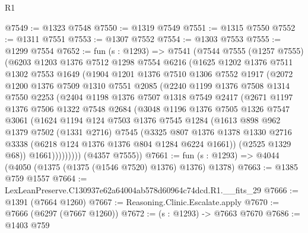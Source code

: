 \begin{lexlean}{R1}
\begin{coremodule}
@7549 := @1323 @7548
@7550 := @1319 @7549
@7551 := @1315 @7550
@7552 := @1311 @7551
@7553 := @1307 @7552
@7554 := @1303 @7553
@7555 := @1299 @7554
@7652 := fun (s : @1293) =>
  @7541
    (@7544
      @7555
      (@1257 @7555)
      (@6203
        @1203
        @1376
        @7512
        @1298
        @7554
        @6216
        (@1625
          @1202
          @1376
          @7511
          @1302
          @7553
          @1649
          (@1904
            @1201
            @1376
            @7510
            @1306
            @7552
            @1917
            (@2072
              @1200
              @1376
              @7509
              @1310
              @7551
              @2085
              (@2240
                @1199
                @1376
                @7508
                @1314
                @7550
                @2253
                (@2404
                  @1198
                  @1376
                  @7507
                  @1318
                  @7549
                  @2417
                  (@2671
                    @1197
                    @1376
                    @7506
                    @1322
                    @7548
                    @2684
                    (@3048
                      @1196
                      @1376
                      @7505
                      @1326
                      @7547
                      @3061
                      (@1624
                        @1194
                        @124
                        @7503
                        @1376
                        @7545
                        @1284
                        (@1613
                          @898
                          @962
                          @1379
                          @7502
                          (@1331 @2716)
                          @7545
                          (@3325
                            @807
                            @1376
                            @1378
                            @1330
                            @2716
                            @3338
                            (@6218 @124 @1376 @1376 @804 @1284 @6224 @1661))
                          (@2525 @1329 @68))
                        @1661)))))))))
      (@4357 @7555))
@7661 := fun (s : @1293) => @4044 (@4050 (@1375 (@1375 (@1546 @7520) @1376) @1376) @1378)
@7663 := @1385 @759 @1557
@7664 := LexLeanPreserve.C130937e62a64004ab578d60964c74dcd.R1.__fits_29
@7666 := @1391 (@7664 @1260)
@7667 := Reasoning.Clinic.Escalate.apply
@7670 := @7666 (@6297 (@7667 @1260))
@7672 := (s : @1293) -> @7663 @7670
@7686 := @1403
    @759

\end{coremodule}
\end{lexlean}
